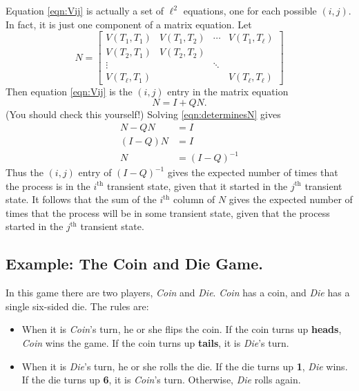 \documentclass[reqno]{immbook}
\numberwithin{equation}{chapter}
\numberwithin{question}{section}
\numberwithin{theorem}{chapter}
\numberwithin{figure}{chapter}
\theoremstyle{definition}
\begin{document}
Equation \eqref{eqn:Vij} is actually a set of $\ell^2$ equations,
one for each possible $(i,j)$.  In fact, it is just one component
of a matrix equation.
Let
\begin{equation}
   N = \begin{bmatrix}
            V(T_1,T_1) & V(T_1,T_2) & \cdots & V(T_1,T_{\ell}) \\
	    V(T_2,T_1) & V(T_2,T_2) \\
	       \vdots  &  &   \ddots \\
	    V(T_{\ell},T_1) & & & V(T_{\ell},T_{\ell})
       \end{bmatrix}
\end{equation}
Then equation \eqref{eqn:Vij} is the $(i,j)$ entry in the
matrix equation
\begin{equation}
   N = I + QN.
\label{eqn:determinesN}
\end{equation}
(You should check this yourself!)
Solving \eqref{eqn:determinesN} gives
\begin{equation}
\begin{split}
  N-QN & = I \\
  (I-Q)N & = I \\
       N & = (I-Q)^{-1}
\end{split}
\end{equation}
Thus the $(i,j)$ entry of $(I-Q)^{-1}$ gives the expected number
of times that the process is in the $i^{\textrm{th}}$ transient
state, given that it started in the $j^{\textrm{th}}$
transient state.
It follows that the sum of the $i^{\textrm{th}}$ column of $N$
gives the expected number of times that the process will be in 
some transient state, given that the process started
in the $j^{\textrm{th}}$ transient state.

\subsection*{Example: The Coin and Die Game.}
In this game there are two players, \emph{Coin}
and \emph{Die}. \emph{Coin} has a coin, and \emph{Die} has a
single six-sided die. The rules are:

\begin{itemize}
\item
When it is \emph{Coin}'s turn, he or she flips the coin.
If the coin turns up \textbf{heads}, \emph{Coin} wins the game.
If the coin turns up \textbf{tails}, it is \emph{Die}'s turn.

\item
When it is \emph{Die}'s turn, he or she rolls the die.
If the die turns up \textbf{1}, \emph{Die} wins.
If the die turns up \textbf{6}, it is \emph{Coin}'s turn.
Otherwise, \emph{Die} rolls again.
\end{itemize}
\end{document}
